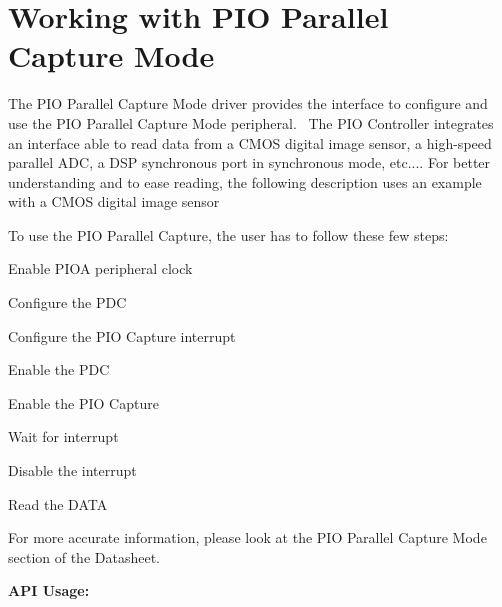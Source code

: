 \hypertarget{group__pio__capture__module}{}\section{Working with P\+IO Parallel Capture Mode}
\label{group__pio__capture__module}
The P\+IO Parallel Capture Mode driver provides the interface to configure and use the P\+IO Parallel Capture Mode peripheral.~\newline
 The P\+IO Controller integrates an interface able to read data from a C\+M\+OS digital image sensor, a high-\/speed parallel A\+DC, a D\+SP synchronous port in synchronous mode, etc.... For better understanding and to ease reading, the following description uses an example with a C\+M\+OS digital image sensor

To use the P\+IO Parallel Capture, the user has to follow these few steps\+: 
\begin{DoxyItemize}
\item Enable P\+I\+OA peripheral clock  
\item Configure the P\+DC  
\item Configure the P\+IO Capture interrupt  
\item Enable the P\+DC  
\item Enable the P\+IO Capture  
\item Wait for interrupt  
\item Disable the interrupt  
\item Read the D\+A\+TA  
\end{DoxyItemize}

For more accurate information, please look at the P\+IO Parallel Capture Mode section of the Datasheet.

{\bfseries{A\+PI Usage\+:}}


